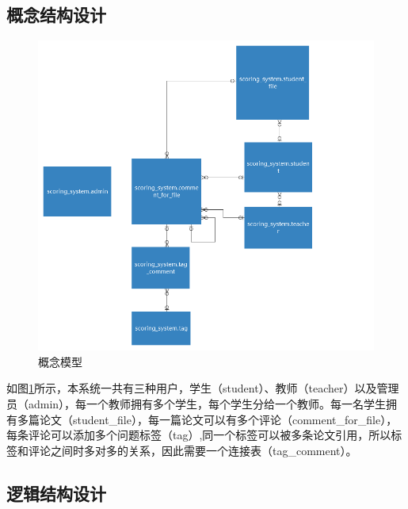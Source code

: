 \subsection{概念结构设计}

\begin{figure}[H]
    \centering
    \includegraphics[scale = 0.5]{out/uml/数据库/conceptual-model.png}
    \caption{\song\wuhao 概念模型}
    \label{conceptual-model}
\end{figure}

如图\ref{conceptual-model}所示，本系统一共有三种用户，学生（student）、教师（teacher）以及管理员（admin），每一个教师拥有多个学生，每个学生分给一个教师。每一名学生拥有多篇论文（student\_file），每一篇论文可以有多个评论（comment\_for\_file），每条评论可以添加多个问题标签（tag）,同一个标签可以被多条论文引用，所以标签和评论之间时多对多的关系，因此需要一个连接表（tag\_comment）。

\subsection{逻辑结构设计}

